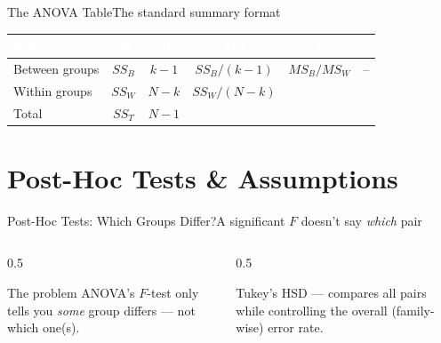 \documentclass[aspectratio=169,11pt]{beamer}
\begin{document}
\begin{frame}{The ANOVA Table}{The standard summary format}
  \small
  \renewcommand{\arraystretch}{1.35}
  \begin{center}
  \begin{tabular}{@{}lccccc@{}}
    \toprule
    \rowcolor{PrimaryDark}
    \textcolor{white}{Source} & \textcolor{white}{SS} & \textcolor{white}{df} &
    \textcolor{white}{MS} & \textcolor{white}{$F$} & \textcolor{white}{$p$} \\
    \midrule
    Between groups & $SS_B$ & $k-1$ & $SS_B/(k-1)$ & $MS_B/MS_W$ & -- \\
    \rowcolor{PrimaryLight!25}
    Within groups & $SS_W$ & $N-k$ & $SS_W/(N-k)$ & & \\
    Total & $SS_T$ & $N-1$ & & & \\
    \bottomrule
  \end{tabular}
  \end{center}
\end{frame}

\section{Post-Hoc Tests \& Assumptions}

\begin{frame}{Post-Hoc Tests: Which Groups Differ?}{A significant $F$ doesn't say \emph{which} pair}
  \begin{columns}[T]
    \begin{column}{0.5\textwidth}
      \begin{alertblock}{The problem}
        \small ANOVA's $F$-test only tells you \emph{some} group differs —
        not which one(s).
      \end{alertblock}
    \end{column}
    \begin{column}{0.5\textwidth}
      \begin{exampleblock}{Tukey's HSD}
        \small {} — compares all
        pairs while controlling the overall (family-wise) error rate.
      \end{exampleblock}
    \end{column}
  \end{columns}
\end{frame}
\end{document}

